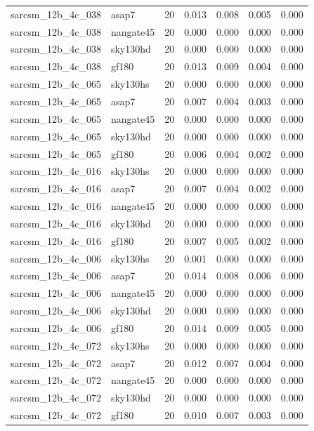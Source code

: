 \begin{tabular}{llrrrrr}
sarcsm\_12b\_4c\_038 & asap7 & 20 & 0.013 & 0.008 & 0.005 & 0.000 \\
sarcsm\_12b\_4c\_038 & nangate45 & 20 & 0.000 & 0.000 & 0.000 & 0.000 \\
sarcsm\_12b\_4c\_038 & sky130hd & 20 & 0.000 & 0.000 & 0.000 & 0.000 \\
sarcsm\_12b\_4c\_038 & gf180 & 20 & 0.013 & 0.009 & 0.004 & 0.000 \\
sarcsm\_12b\_4c\_065 & sky130hs & 20 & 0.000 & 0.000 & 0.000 & 0.000 \\
sarcsm\_12b\_4c\_065 & asap7 & 20 & 0.007 & 0.004 & 0.003 & 0.000 \\
sarcsm\_12b\_4c\_065 & nangate45 & 20 & 0.000 & 0.000 & 0.000 & 0.000 \\
sarcsm\_12b\_4c\_065 & sky130hd & 20 & 0.000 & 0.000 & 0.000 & 0.000 \\
sarcsm\_12b\_4c\_065 & gf180 & 20 & 0.006 & 0.004 & 0.002 & 0.000 \\
sarcsm\_12b\_4c\_016 & sky130hs & 20 & 0.000 & 0.000 & 0.000 & 0.000 \\
sarcsm\_12b\_4c\_016 & asap7 & 20 & 0.007 & 0.004 & 0.002 & 0.000 \\
sarcsm\_12b\_4c\_016 & nangate45 & 20 & 0.000 & 0.000 & 0.000 & 0.000 \\
sarcsm\_12b\_4c\_016 & sky130hd & 20 & 0.000 & 0.000 & 0.000 & 0.000 \\
sarcsm\_12b\_4c\_016 & gf180 & 20 & 0.007 & 0.005 & 0.002 & 0.000 \\
sarcsm\_12b\_4c\_006 & sky130hs & 20 & 0.001 & 0.000 & 0.000 & 0.000 \\
sarcsm\_12b\_4c\_006 & asap7 & 20 & 0.014 & 0.008 & 0.006 & 0.000 \\
sarcsm\_12b\_4c\_006 & nangate45 & 20 & 0.000 & 0.000 & 0.000 & 0.000 \\
sarcsm\_12b\_4c\_006 & sky130hd & 20 & 0.000 & 0.000 & 0.000 & 0.000 \\
sarcsm\_12b\_4c\_006 & gf180 & 20 & 0.014 & 0.009 & 0.005 & 0.000 \\
sarcsm\_12b\_4c\_072 & sky130hs & 20 & 0.000 & 0.000 & 0.000 & 0.000 \\
sarcsm\_12b\_4c\_072 & asap7 & 20 & 0.012 & 0.007 & 0.004 & 0.000 \\
sarcsm\_12b\_4c\_072 & nangate45 & 20 & 0.000 & 0.000 & 0.000 & 0.000 \\
sarcsm\_12b\_4c\_072 & sky130hd & 20 & 0.000 & 0.000 & 0.000 & 0.000 \\
sarcsm\_12b\_4c\_072 & gf180 & 20 & 0.010 & 0.007 & 0.003 & 0.000 \\

\end{tabular}
